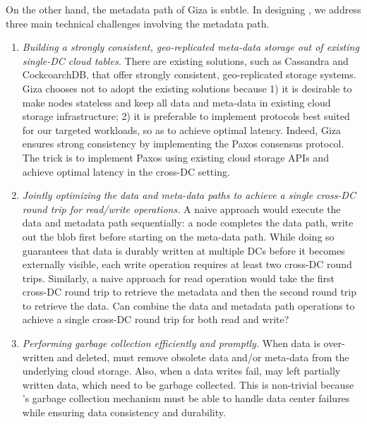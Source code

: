 On the other hand, the metadata path of Giza is subtle.
In designing \name, we address three main technical challenges involving the metadata path.
\begin{enumerate}

\item {\it Building a strongly consistent, geo-replicated meta-data storage out of existing 
single-DC cloud tables.}
There are existing solutions, such as Cassandra and CockcoarchDB,
that offer strongly consistent, geo-replicated storage systems.
Giza chooses not to adopt the existing solutions because
1) it is desirable to make \name nodes stateless and keep all data and meta-data
in existing cloud storage infrastructure;
2) it is preferable to implement protocols best suited for our targeted workloads,
so as to achieve optimal latency.
Indeed, Giza ensures strong consistency by implementing the Paxos consensus protocol.
The trick is to implement Paxos using existing cloud storage APIs and achieve 
optimal latency in the cross-DC setting.

\item {\it Jointly optimizing the data and meta-data paths to achieve a single
cross-DC round trip for read/write operations.}
A naive approach would execute the data and metadata path sequentially:
a \name node completes the data path, write out the blob first before starting on the meta-data path.
While doing so guarantees that data is durably written at multiple DCs
before it becomes externally visible, each write operation requires at least two cross-DC round trips.
Similarly, a naive approach for read operation would take the first cross-DC round trip to retrieve the metadata
and then the second round trip to retrieve the data.
Can \name combine the data and metadata path operations to achieve a single cross-DC round trip for both read and write?

\item {\it Performing garbage collection efficiently and promptly.} 
When data is over-written and deleted, \name must remove obsolete data and/or meta-data from
the underlying cloud storage. Also, when a data writes fail, \name may left partially written data, which need to be
garbage collected.  
This is non-trivial because \name's garbage 
collection mechanism must be able to handle data center failures while ensuring data 
consistency and durability.

\end{enumerate}

%


